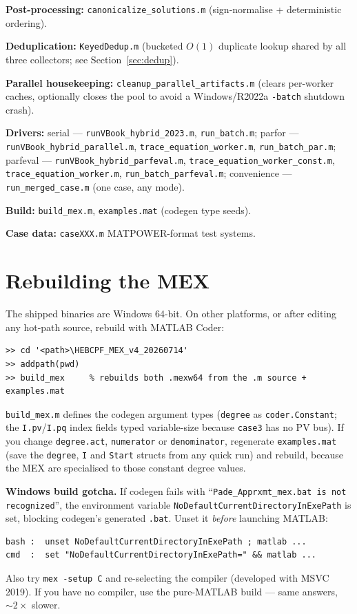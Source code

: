 \documentclass[11pt,a4paper]{article}
\newcommand{\code}[1]{\texttt{#1}}
\begin{document}
\textbf{Post-processing:} \code{canonicalize_solutions.m} (sign-normalise + deterministic
ordering).

\textbf{Deduplication:} \code{KeyedDedup.m} (bucketed $O(1)$ duplicate lookup shared by all
three collectors; see Section~\ref{sec:dedup}).

\textbf{Parallel housekeeping:} \code{cleanup_parallel_artifacts.m} (clears per-worker
caches, optionally closes the pool to avoid a Windows/R2022a \code{-batch} shutdown
crash).

\textbf{Drivers:}
serial --- \code{runVBook_hybrid_2023.m}, \code{run_batch.m};
parfor --- \code{runVBook_hybrid_parallel.m}, \code{trace_equation_worker.m},
\code{run_batch_par.m};
parfeval --- \code{runVBook_hybrid_parfeval.m}, \code{trace_equation_worker_const.m},
\code{trace_equation_worker.m}, \code{run_batch_parfeval.m};
convenience --- \code{run_merged_case.m} (one case, any mode).

\textbf{Build:} \code{build_mex.m}, \code{examples.mat} (codegen type seeds).

\textbf{Case data:} \code{caseXXX.m} MATPOWER-format test systems.

\section{Rebuilding the MEX}\label{sec:mex}

The shipped binaries are Windows 64-bit. On other platforms, or after editing any
hot-path source, rebuild with MATLAB Coder:
\begin{lstlisting}[style=mat]
>> cd '<path>\HEBCPF_MEX_v4_20260714'
>> addpath(pwd)
>> build_mex     % rebuilds both .mexw64 from the .m source + examples.mat
\end{lstlisting}
\code{build_mex.m} defines the codegen argument types (\code{degree} as
\code{coder.Constant}; the \code{I.pv}/\code{I.pq} index fields typed variable-size
because \code{case3} has no PV bus). If you change \code{degree.act}, \code{numerator} or
\code{denominator}, regenerate \code{examples.mat} (save the \code{degree}, \code{I} and
\code{Start} structs from any quick run) and rebuild, because the MEX are specialised to
those constant degree values.

\textbf{Windows build gotcha.} If codegen fails with
``\code{Pade_Apprxmt_mex.bat is not recognized}'', the environment variable
\code{NoDefaultCurrentDirectoryInExePath} is set, blocking codegen's generated \code{.bat}.
Unset it \emph{before} launching MATLAB:
\begin{lstlisting}[style=sh]
bash :  unset NoDefaultCurrentDirectoryInExePath ; matlab ...
cmd  :  set "NoDefaultCurrentDirectoryInExePath=" && matlab ...
\end{lstlisting}
Also try \code{mex -setup C} and re-selecting the compiler (developed with MSVC 2019). If
you have no compiler, use the pure-MATLAB build --- same answers, $\sim 2\times$ slower.
\end{document}
